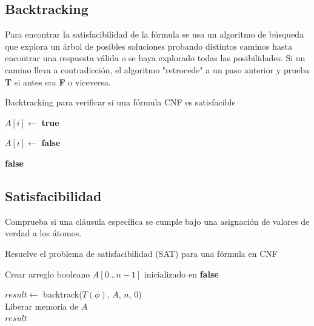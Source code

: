\documentclass{report}
\begin{document}
	\subsection{Backtracking}
	Para encontrar la satisfacibilidad de la f\'ormula se usa un algoritmo de b\'usqueda que explora un \'arbol de posibles soluciones probando distintos caminos hasta encontrar una respuesta v\'alida o se haya explorado todas las posibilidades. Si un camino lleva a contradicci\'on, el algoritmo "retrocede" a un paso anterior y prueba \textbf{T} si antes era \textbf{F} o viceversa. \\
	\begin{algorithm}[H]
		\caption{Backtracking para verificar si una fórmula CNF es satisfacible}
			
			$A[i] \gets$ \textbf{true} \\
			
			$A[i] \gets$ \textbf{false} \\
			
			\KwRet \textbf{false}
	\end{algorithm}
	\subsection{Satisfacibilidad}
	Comprueba si una cl\'ausula espec\'ifica se cumple bajo una asignaci\'on de valores de verdad a los \'atomos. \\
	\begin{algorithm}[H]
		\caption{Resuelve el problema de satisfacibilidad (SAT) para una fórmula en CNF}
			Crear arreglo booleano $A[0 \dots n{-}1]$ inicializado en \textbf{false} \\
			
			$result \gets$ backtrack($T(\phi)$, $A$, $n$, $0$) \\
			Liberar memoria de $A$ \\
			\KwRet $result$
	\end{algorithm}
	\newpage
\end{document}
